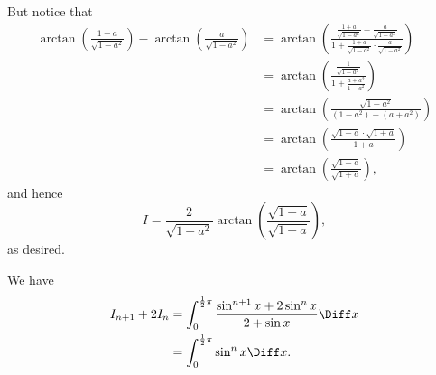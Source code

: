 But notice that
\begin{align*}
    \arctan\left(\frac{1 + a}{\sqrt{1 - a^2}}\right) - \arctan\left(\frac{a}{\sqrt{1 - a^2}}\right) & = \arctan \left(\frac{\frac{1 + a}{\sqrt{1 - a^2}} - \frac{a}{\sqrt{1 - a^2}}}{1 + \frac{1 + a}{\sqrt{1 - a^2}} \cdot \frac{a}{\sqrt{1 - a^2}}}\right) \\
                                                                                                    & = \arctan \left(\frac{\frac{1}{\sqrt{1 - a^2}}}{1 + \frac{a + a^2}{1 - a^2}}\right)                                                                    \\
                                                                                                    & = \arctan \left(\frac{\sqrt{1 - a^2}}{(1 - a^2) + (a + a^2)}\right)                                                                                    \\
                                                                                                    & = \arctan \left(\frac{\sqrt{1 - a} \cdot \sqrt{1 + a}}{1 + a}\right)                                                                                   \\
                                                                                                    & = \arctan \left(\frac{\sqrt{1 - a}}{\sqrt{1 + a}}\right),
\end{align*}
and hence
\[
    I = \frac{2}{\sqrt{1 - a^2}} \arctan \left(\frac{\sqrt{1 - a}}{\sqrt{1 + a}}\right),
\]
as desired.

We have
\begin{align*}
    I_{n + 1} + 2 I_n & = \int_{0}^{\frac{1}{2}\pi} \frac{\sin^{n + 1}x + 2 \sin^n x}{2 + \sin x} \Diff x \\
                      & = \int_{0}^{\frac{1}{2}\pi} \sin^n x\Diff x.
\end{align*}

